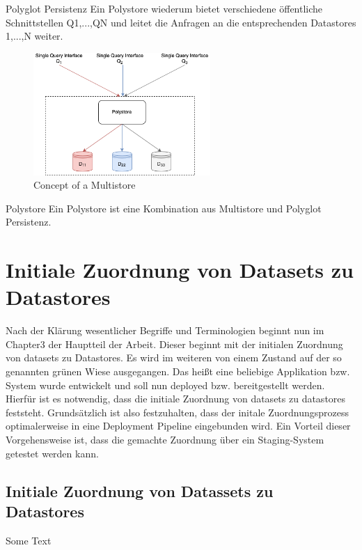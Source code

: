 Polyglot Persistenz
Ein Polystore wiederum bietet verschiedene öffentliche Schnittstellen Q1,...,QN und leitet die Anfragen an die entsprechenden 
Datastores 1,...,N weiter.

\begin{figure}[htbp]
    \centering
    \includegraphics[width=0.60\textwidth]{gfx/examples/master_thesis-polystore.png}
    \caption{Concept of a Multistore}
    \label{fig:multistore}
\end{figure} 

Polystore
Ein Polystore ist eine Kombination aus Multistore und Polyglot Persistenz.


\chapter{Initiale Zuordnung von Datasets zu Datastores}

Nach der Klärung wesentlicher Begriffe und Terminologien beginnt nun im Chapter3 der Hauptteil
der Arbeit. Dieser beginnt mit der initialen Zuordnung von datasets zu Datastores.
Es wird im weiteren von einem Zustand auf der so genannten grünen Wiese ausgegangen.
Das heißt eine beliebige Applikation bzw. System wurde entwickelt und soll nun 
deployed bzw. bereitgestellt werden. Hierfür ist es notwendig, dass die initiale
Zuordnung von datasets zu datastores feststeht.
Grundsätzlich ist also festzuhalten, dass der initale Zuordnungsprozess 
optimalerweise in eine Deployment Pipeline eingebunden wird.
Ein Vorteil dieser Vorgehensweise ist, dass die gemachte Zuordnung über ein 
Staging-System getestet werden kann.

\section{Initiale Zuordnung von Datassets zu Datastores}
\label{sec:main:init}
Some Text



